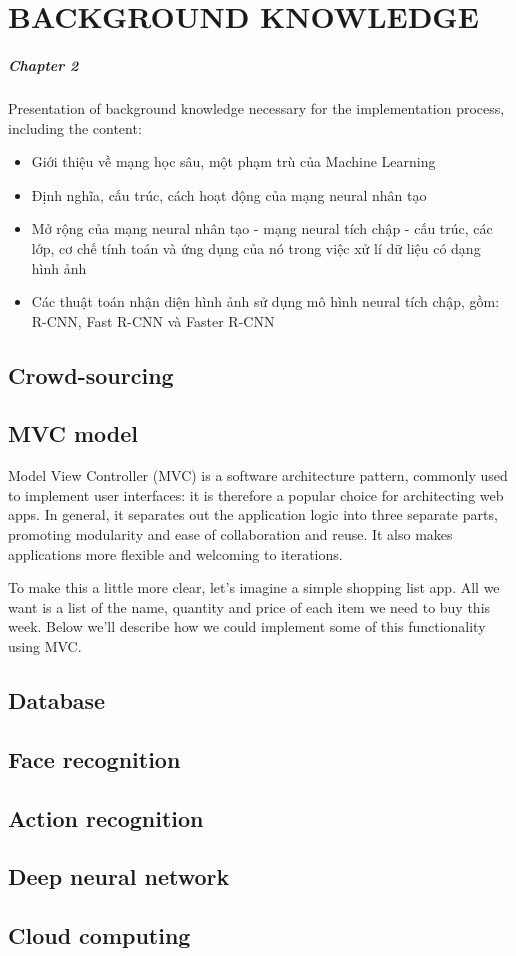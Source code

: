 \chapter{BACKGROUND KNOWLEDGE}
\label{chap:background}
\paragraph{Chapter 2} Presentation of background knowledge necessary for the implementation process, including the content:

\begin{itemize}
\item Giới thiệu về mạng học sâu, một phạm trù của Machine Learning

\item Định nghĩa, cấu trúc, cách hoạt động của mạng neural nhân tạo

\item Mở rộng của mạng neural nhân tạo - mạng neural tích chập - cấu trúc, các lớp, cơ chế tính toán và ứng dụng của nó trong việc xử lí dữ liệu có dạng hình ảnh

\item Các thuật toán nhận diện hình ảnh sử dụng mô hình neural tích chập, gồm: R-CNN, Fast R-CNN và Faster R-CNN
\end{itemize}

\section{Crowd-sourcing}

\section{MVC model}
Model View Controller (MVC) is a software architecture pattern, commonly used to implement user interfaces: it is therefore a popular choice for architecting web apps. In general, it separates out the application logic into three separate parts, promoting modularity and ease of collaboration and reuse. It also makes applications more flexible and welcoming to iterations.

To make this a little more clear, let's imagine a simple shopping list app. All we want is a list of the name, quantity and price of each item we need to buy this week. Below we'll describe how we could implement some of this functionality using MVC.

\section{Database}
\section{Face recognition}
\section{Action recognition}
\section{Deep neural network}
\section{Cloud computing}
